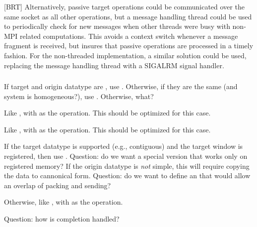 \documentclass{article}
\begin{document}
[BRT] Alternatively, passive target operations could be communicated
over the same socket as all other operations, but a message handling
thread could be used to periodically check for new messages when other
threads were busy with non-MPI related computations.  This avoids a
context switch whenever a message fragment is received, but insures
that passive operations are processed in a timely fashion.  For the
non-threaded implementation, a similar solution could be used,
replacing the message handling thread with a SIGALRM signal handler.

\subsubsection{}
\begin{adi3}
\begin{mmadi}If target and origin datatype are
, use 
  .  Otherwise, if they are the same (and system is
  homogeneous?), use .  
  Otherwise, what?

\begin{tcp}
Like , with  as the operation. 
This should be optimized for this case.  
\end{tcp}

\begin{shmem}
Like , with  as the operation.  
This should be optimized for this case.  
\end{shmem}

\begin{via}
If the target datatype is supported (e.g., contiguous) and the target window
is registered, then use .  Question: do we want a
special version that works only on registered memory?  If the origin datatype
is \emph{not} simple, this will require copying the data to cannonical form.
Question: do we want to define an  that would
allow an overlap of packing and sending?

Otherwise, like , with  as the
operation.  

Question: how is completion handled?
\end{via}

\end{mmadi}
\end{adi3}
\end{document}
